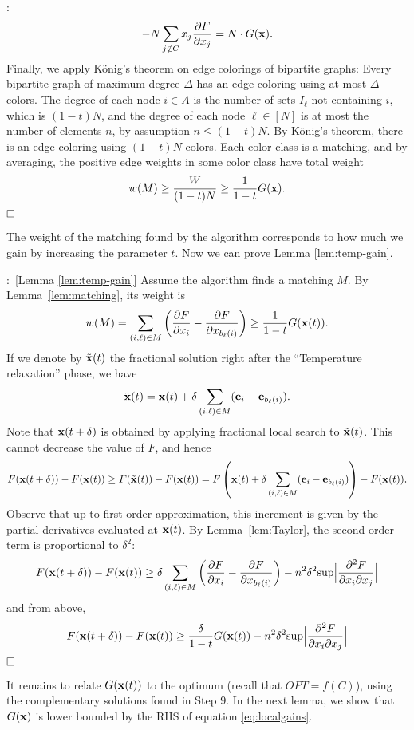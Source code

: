 \documentclass{article}[11pt]
\newcommand{\partdiff}[2]{\frac{\partial {#1}}{\partial {#2}}}
\newcommand{\mixdiff}[3]{\frac{\partial^2 {#1}}{{\partial {#2}}{\partial {#3}}}}
\renewenvironment{proof}{\noindent{\bf Proof}:~}{$\hfill \Box$\\}
\def\be{{\bf e}}
\def\bx{{\bf x}}
\def\sup{{\rm{sup}}}
\def\G{{G}}
\begin{document}
\begin{proof}
$$    - N \sum_{j \notin C} x_j \partdiff{F}{x_j} = N \cdot \G(\bx). $$
Finally, we apply K\"{o}nig's theorem on edge colorings of bipartite graphs:
Every bipartite graph of maximum degree $\Delta$ has an edge coloring using
at most $\Delta$ colors.
The degree of each node $i \in A$ is the number of sets $I_\ell$ not containing $i$,
which is $(1-t)N$, and the degree of each node $\ell \in [N]$ is at most the number
of elements $n$, by assumption $n \leq (1-t)N$. By K\"{o}nig's theorem,
there is an edge coloring using $(1-t)N$ colors. Each color class is a matching,
and by averaging, the positive edge weights in some color class have total weight
$$ w(M) \geq \frac{W}{(1-t)N} \geq \frac{1}{1-t} \G(\bx).$$
\end{proof}


The weight of the matching found by the algorithm corresponds to how
much we gain by increasing the parameter $t$. Now we can prove Lemma \ref{lem:temp-gain}.

\medskip


\begin{proof}[Lemma \ref{lem:temp-gain}]
Assume the algorithm finds a matching $M$. By Lemma~\ref{lem:matching},
its weight is
$$ w(M) = \sum_{(i,\ell) \in M} \left(\partdiff{F}{x_i} - \partdiff{F}{x_{b_\ell(i)}} \right)
 \geq \frac{1}{1-t} \G(\bx(t)).
 $$
If we denote by $\tilde{\bx}(t)$ the fractional solution right after the ``Temperature relaxation'' phase, we have
$$ \tilde{\bx}(t) = \bx(t) + \delta \sum_{(i,\ell) \in M} (\be_i - \be_{b_\ell(i)}).$$
Note that $\bx(t+\delta)$ is obtained by applying fractional local search to $\tilde{\bx}(t)$.
This cannot decrease the value of $F$, and hence
$$ F(\bx(t+\delta)) - F(\bx(t)) \geq F(\tilde{\bx}(t)) - F(\bx(t))
 = F\left(\bx(t) + \delta \sum_{(i,\ell) \in M} (\be_i - \be_{b_\ell(i)})\right) - F(\bx(t)).$$
Observe that up to first-order approximation, this increment is given by the
partial derivatives evaluated at $\bx(t)$. 
By Lemma~\ref{lem:Taylor}, the second-order term is proportional to $\delta^2$:
$$ F(\bx(t+\delta)) - F(\bx(t)) \geq \delta \sum_{(i,\ell) \in M} \left(\partdiff{F}{x_i}
 - \partdiff{F}{x_{b_\ell(i)}} \right) - n^2 \delta^2 \sup \Big|\mixdiff{F}{x_i}{x_j}\Big| $$
and from above,
$$ F(\bx(t+\delta)) - F(\bx(t)) \geq \frac{\delta}{1-t} \G(\bx(t))
- n^2 \delta^2 \sup \Big|\mixdiff{F}{x_i}{x_j}\Big| $$
\end{proof}

It remains to relate $\G(\bx(t))$ to the optimum (recall that $OPT = f(C)$),
using the complementary solutions found in Step 9.
In the next lemma, we show that $G(\bx)$ is lower bounded by the RHS of equation
\eqref{eq:localgains}.
\end{document}
